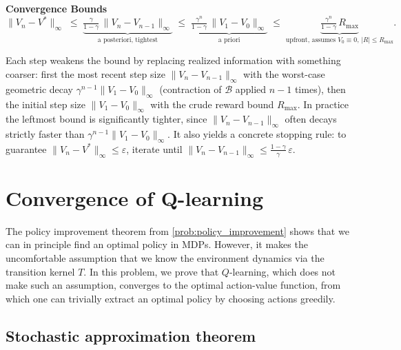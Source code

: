 \documentclass[11pt]{article}
\begin{document}
\begin{callout}[note]
\textbf{Convergence Bounds}
$$
\|V_n - V^*\|_\infty
\;\le\; \underbrace{\tfrac{\gamma}{1-\gamma}\, \|V_n - V_{n-1}\|_\infty}_{\text{a~posteriori, tightest}}
\;\le\; \underbrace{\tfrac{\gamma^n}{1-\gamma}\, \|V_1 - V_0\|_\infty}_{\text{a~priori}}
\;\le\; \underbrace{\tfrac{\gamma^n}{1-\gamma}\, R_{\max}}_{\text{upfront, assumes } V_0 \equiv 0,\, |R| \le R_{\max}}.
$$
\end{callout}
Each step weakens the bound by replacing realized information with something coarser: first the most recent step size $\|V_n - V_{n-1}\|_\infty$ with the worst-case geometric decay $\gamma^{n-1}\|V_1 - V_0\|_\infty$ (contraction of $\mathcal{B}$ applied $n-1$ times), then the initial step size $\|V_1 - V_0\|_\infty$ with the crude reward bound $R_{\max}$. In practice the leftmost bound is significantly tighter, since $\|V_n - V_{n-1}\|_\infty$ often decays strictly faster than $\gamma^{n-1}\|V_1 - V_0\|_\infty$. It also yields a concrete stopping rule: to guarantee $\|V_n - V^*\|_\infty \le \varepsilon$, iterate until $\|V_n - V_{n-1}\|_\infty \le \frac{1-\gamma}{\gamma}\, \varepsilon$.



\section{Convergence of Q-learning}\label{prob:q_learning}

The policy improvement theorem from \cref{prob:policy_improvement} shows that we can in principle find an optimal policy in MDPs. However, it makes the uncomfortable assumption that we know the environment dynamics via the transition kernel $T$. In this problem, we prove that $Q$-learning, which does not make such an assumption, converges to the optimal action-value function, from which one can trivially extract an optimal policy by choosing actions greedily.

\subsection*{Stochastic approximation theorem}
\end{document}
